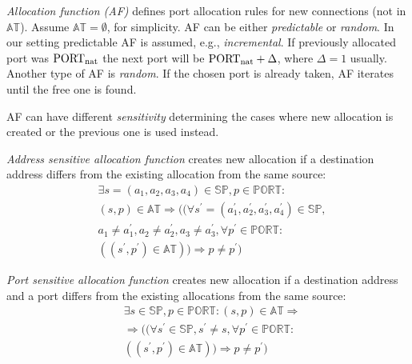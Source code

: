 \documentclass[twoside]{article}
\begin{document}
\begin{multicols}{2}
\emph{Allocation function (AF)} defines port allocation rules for new connections (not in $\mathbb{AT}$). Assume $\mathbb{AT}=\emptyset$, for simplicity. 
AF can be either \emph{predictable} or \emph{random}. In our setting predictable AF is assumed, e.g., \emph{incremental}. 
If previously allocated port was $\text{PORT\textsubscript{nat}}$
the next port will be $\text{PORT\textsubscript{nat}}+\Delta$, where $\Delta=1$ usually. Another type of AF is \emph{random}.
If the chosen port is already taken, AF iterates until the free one is found.

AF can have different \emph{sensitivity} determining the cases where new allocation is created or the previous one is used instead.

\emph{Address sensitive allocation function} creates new allocation if a destination address differs from the existing allocation 
from the same source:
\begin{align*}
& \exists s=(a_1,a_2,a_3,a_4) \in \mathbb{SP}, p \in \mathbb{PORT}: \\
& (s, p) \in \mathbb{AT} \Rightarrow ((\forall s^{\prime}=(a_1^{\prime},a_2^{\prime},a_3^{\prime},a_4^{\prime}) \in \mathbb{SP}, \\
& a_1 \neq a_1^{\prime}, a_2 \neq a_2^{\prime}, a_3 \neq a_3^{\prime}, \forall p^{\prime} \in \mathbb{PORT}: \\
& ((s^{\prime}, p^{\prime}) \in \mathbb{AT})) \Rightarrow p \neq p^{\prime})
\end{align*}

\emph{Port sensitive allocation function} creates new allocation if a destination address and a port differs from the existing
allocations from the same source:
\begin{align*}
& \exists s \in \mathbb{SP}, p \in \mathbb{PORT}: (s, p) \in \mathbb{AT} \Rightarrow \\
& \Rightarrow ((\forall s^{\prime} \in \mathbb{SP}, s^{\prime} \neq s , \forall p^{\prime} \in \mathbb{PORT}: \\
& ((s^{\prime}, p^{\prime}) \in \mathbb{AT})) \Rightarrow p \neq p^{\prime})
\end{align*}

% 


\end{multicols}
\end{document}
